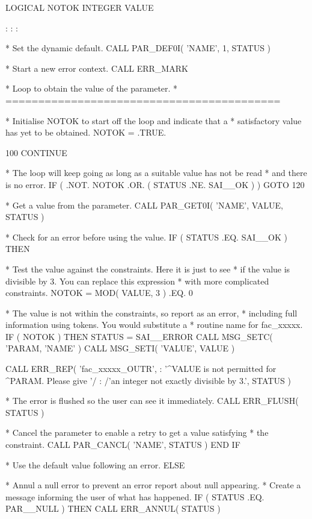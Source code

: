 \documentclass[twoside,11pt,nolof]{starlink}
\begin{document}
\begin{terminalv}
      LOGICAL NOTOK
      INTEGER VALUE

          :       :       :

*  Set the dynamic default.
      CALL PAR_DEF0I( 'NAME', 1, STATUS )

*  Start a new error context.
      CALL ERR_MARK

*  Loop to obtain the value of the parameter.
*  ==========================================

*  Initialise NOTOK to start off the loop and indicate that a
*  satisfactory value has yet to be obtained.
      NOTOK = .TRUE.

  100 CONTINUE

*  The loop will keep going as long as a suitable value has not be read
*  and there is no error.
         IF ( .NOT. NOTOK .OR. ( STATUS .NE. SAI__OK ) ) GOTO 120

*  Get a value from the parameter.
         CALL PAR_GET0I( 'NAME', VALUE, STATUS )

*  Check for an error before using the value.
         IF ( STATUS .EQ. SAI__OK ) THEN

*  Test the value against the constraints.  Here it is just to see
*  if the value is divisible by 3.  You can replace this expression
*  with more complicated constraints.
            NOTOK = MOD( VALUE, 3 ) .EQ. 0

*  The value is not within the constraints, so report as an error,
*  including full information using tokens.  You would substitute a
*  routine name for fac_xxxxx.
            IF ( NOTOK ) THEN
               STATUS = SAI__ERROR
               CALL MSG_SETC( 'PARAM, 'NAME' )
               CALL MSG_SETI( 'VALUE', VALUE )

               CALL ERR_REP( 'fac_xxxxx_OUTR',
    :            '^VALUE is not permitted for ^PARAM.  Please give '/
    :            /'an integer not exactly divisible by 3.', STATUS )

*  The error is flushed so the user can see it immediately.
               CALL ERR_FLUSH( STATUS )

*  Cancel the parameter to enable a retry to get a value satisfying
*  the constraint.
               CALL PAR_CANCL( 'NAME', STATUS )
            END IF

*  Use the default value following an error.
         ELSE

*  Annul a null error to prevent an error report about null appearing.
*  Create a message informing the user of what has happened.
            IF ( STATUS .EQ. PAR__NULL ) THEN
               CALL ERR_ANNUL( STATUS )


\end{terminalv}
\end{document}
